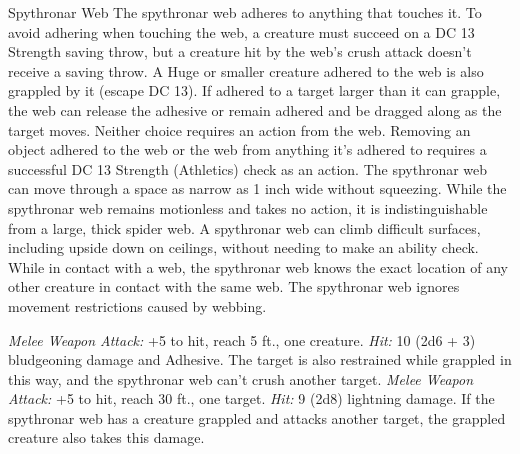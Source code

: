 \documentclass[10pt,a4paper,twoside,twocolumn,openany,bg=print,nodeprecatedcode]{dndbook}
\begin{document}
\begin{DndMonster}[float*=t]{Spythronar Web}
\DndMonsterBasics[
armor-class = {13},
hit-points = {\DndDice{10d10 + 10}},
speed = {30 ft., 30 ft. (key)}
]
\DndMonsterAbilityScores[
 str = 17,
 dex = 16,
 con = 13,
 int = 3,
 wis = 8,
 cha = 1
]
\DndMonsterDetails[
damage-vulnerabilities = {fire},
damage-resistances = {bludgeoning, piercing},
damage-immunities = {lightning},
senses = {tremorsense 60 ft. (blind beyond this radius), passive perception 9},
challenge = 2,
]
The spythronar web adheres to anything that touches it. To avoid adhering when touching the web, a creature must succeed on a DC 13 Strength saving throw, but a creature hit by the web's crush attack doesn't receive a saving throw. A Huge or smaller creature adhered to the web is also grappled by it (escape DC 13). If adhered to a target larger than it can grapple, the web can release the adhesive or remain adhered and be dragged along as the target moves. Neither choice requires an action from the web. Removing an object adhered to the web or the web from anything it's adhered to requires a successful DC 13 Strength (Athletics) check as an action.
The spythronar web can move through a space as narrow as 1 inch wide without squeezing.
While the spythronar web remains motionless and takes no action, it is indistinguishable from a large, thick spider web.
A spythronar web can climb difficult surfaces, including upside down on ceilings, without needing to make an ability check.
While in contact with a web, the spythronar web knows the exact location of any other creature in contact with the same web.
The spythronar web ignores movement restrictions caused by webbing.
\par
{}
\textsl{Melee Weapon Attack:} +5 to hit, reach 5 ft., one creature. \textsl{Hit:} 10 (2d6 + 3) bludgeoning damage and Adhesive. The target is also restrained while grappled in this way, and the spythronar web can't crush another target.
\textsl{Melee Weapon Attack:} +5 to hit, reach 30 ft., one target. \textsl{Hit:} 9 (2d8) lightning damage. If the spythronar web has a creature grappled and attacks another target, the grappled creature also takes this damage.
\end{DndMonster}
\end{document}

